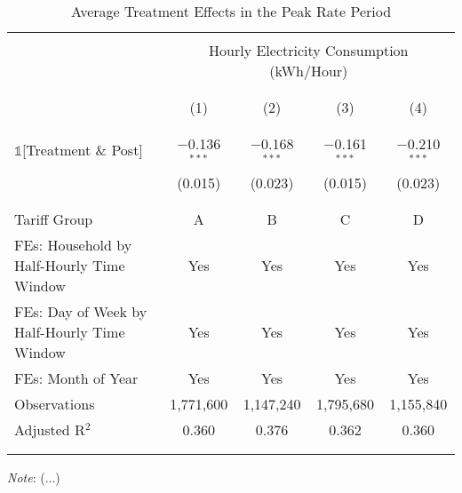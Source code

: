 \begin{table}[!th]
\caption{Average Treatment Effects in the Peak Rate Period}
\centering
\small
\begin{tabular}{@{\extracolsep{20pt}}lcccc} 
\\[-5.5ex]
\hline \hline
\\[-3.0ex] 
 & \multicolumn{4}{c}{Hourly Electricity Consumption  (kWh/Hour)} \\
\\[-3.0ex]  
\cline{2-5} 
\\[-3.0ex]
 & (1) & (2) & (3) & (4) \\
\\[-3.0ex] 
\hline
\\[-2.0ex] 
$\mathbb{1}$[Treatment \& Post] & $-$0.136$^{***}$ & $-$0.168$^{***}$ & $-$0.161$^{***}$ & $-$0.210$^{***}$ \\ 
 & (0.015) & (0.023) & (0.015) & (0.023) \\ 
 & & & & \\ 
\hline
\\[-2.0ex] 
Tariff Group & A & B & C & D \\
FEs: Household by Half-Hourly Time Window & Yes & Yes & Yes & Yes \\ 
FEs: Day of Week by Half-Hourly Time Window & Yes & Yes & Yes & Yes \\ 
FEs: Month of Year & Yes & Yes & Yes & Yes \\ 
Observations & 1,771,600 & 1,147,240 & 1,795,680 & 1,155,840 \\ 
Adjusted R$^{2}$ & 0.360 & 0.376 & 0.362 & 0.360 \\ 
\\[-2.0ex]
\hline \hline
\\[-4.5ex] 
\end{tabular}
\begin{tablenotes}
    \small
    \textit{Note}: (...) 
\end{tablenotes}
\label{Table:Average-Treatment-Effects-in-the-Peak-Rate-Period}
\end{table}
